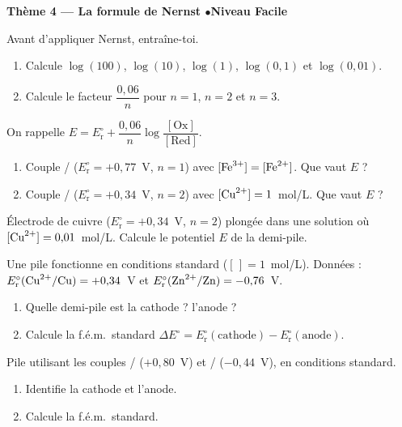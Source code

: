 \documentclass[11pt,a4paper]{article}
\begin{document}
\begin{center}\color{primarydark}\large\bfseries Thème 4 — La formule de Nernst \quad$\bullet$\quad Niveau Facile\end{center}

\begin{exo}
Avant d'appliquer Nernst, entraîne-toi.
\begin{enumerate}[label=\alph*)]
  \item Calcule $\log(100)$, $\log(10)$, $\log(1)$, $\log(0{,}1)$ et $\log(0{,}01)$.
  \item Calcule le facteur $\dfrac{0{,}06}{n}$ pour $n=1$, $n=2$ et $n=3$.
\end{enumerate}
\end{exo}

\begin{exo}
On rappelle $E=E_{\mathrm{r}}^{\circ}+\dfrac{0{,}06}{n}\log\dfrac{[\mathrm{Ox}]}{[\mathrm{Red}]}$.
\begin{enumerate}[label=\alph*)]
  \item Couple / ($E_{\mathrm{r}}^{\circ}=+0{,}77$~V, $n=1$) avec
        $[\ce{Fe^{3+}}]=[\ce{Fe^{2+}}]$. Que vaut $E$ ?
  \item Couple / ($E_{\mathrm{r}}^{\circ}=+0{,}34$~V, $n=2$) avec
        $[\ce{Cu^{2+}}]=1$~mol/L. Que vaut $E$ ?
\end{enumerate}
\end{exo}

\begin{exo}
Électrode de cuivre  ($E_{\mathrm{r}}^{\circ}=+0{,}34$~V, $n=2$) plongée
dans une solution où $[\ce{Cu^{2+}}]=0{,}01$~mol/L. Calcule le potentiel $E$ de la demi-pile.
\end{exo}

\begin{exo}
Une pile fonctionne en conditions standard ($[\,]=1$~mol/L). Données :
$E_{\mathrm{r}}^{\circ}(\ce{Cu^{2+}}/\ce{Cu})=+0{,}34$~V et
$E_{\mathrm{r}}^{\circ}(\ce{Zn^{2+}}/\ce{Zn})=-0{,}76$~V.
\begin{enumerate}[label=\alph*)]
  \item Quelle demi-pile est la cathode ? l'anode ?
  \item Calcule la f.é.m.\ standard $\Delta E^{\circ}=E_{\mathrm{r}}^{\circ}(\text{cathode})
        -E_{\mathrm{r}}^{\circ}(\text{anode})$.
\end{enumerate}
\end{exo}

\begin{exo}
Pile utilisant les couples / ($+0{,}80$~V) et / ($-0{,}44$~V), en
conditions standard.
\begin{enumerate}[label=\alph*)]
  \item Identifie la cathode et l'anode.
  \item Calcule la f.é.m.\ standard.
\end{enumerate}
\end{exo}
\end{document}
